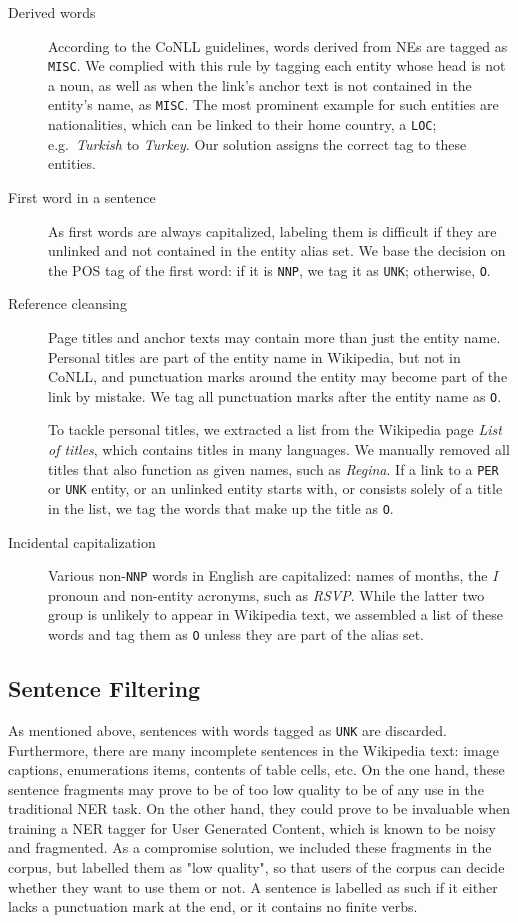 \documentclass[11pt]{article}
\begin{document}
\begin{description}
\item[Derived words] According to the CoNLL guidelines, words derived from NEs are tagged as \texttt{MISC}. We complied with this rule by tagging each entity whose head is not a noun, as well as when the link's anchor text is not contained in the entity's name, as \texttt{MISC}. The most prominent example for such entities are nationalities, which can be linked to their home country, a \texttt{LOC}; e.g.~\textit{Turkish} to \textit{Turkey}. Our solution assigns the correct tag to these entities.
\item[First word in a sentence] As first words are always capitalized, labeling them is difficult if they are unlinked and not contained in the entity alias set. We base the decision on the POS tag of the first word: if it is \texttt{NNP}, we tag it as \texttt{UNK}; otherwise, \texttt{O}.
\item[Reference cleansing] Page titles and anchor texts may contain more than just the entity name. Personal titles are part of the entity name in Wikipedia, but not in CoNLL, and punctuation marks around the entity may become part of the link by mistake. We tag all punctuation marks after the entity name as \texttt{O}.

To tackle personal titles, we extracted a list from the Wikipedia page \textit{List of titles}, which contains titles in many languages. We manually removed all titles that also function as given names, such as \textit{Regina}. If a link to a \texttt{PER} or \texttt{UNK} entity, or an unlinked entity starts with, or consists solely of a title in the list, we tag the words that make up the title as \texttt{O}.
\item[Incidental capitalization] Various non-\texttt{NNP} words in English are capitalized: names of months, the \textit{I} pronoun and non-entity acronyms, such as \textit{RSVP}. While the latter two group is unlikely to appear in Wikipedia text, we assembled a list of these words and tag them as \texttt{O} unless they are part of the alias set.
\end{description}

\subsection{Sentence Filtering}

As mentioned above, sentences with words tagged as \texttt{UNK} are discarded. Furthermore, there are many incomplete sentences in the Wikipedia text: image captions, enumerations items, contents of table cells, etc. On the one hand, these sentence fragments may prove to be of too low quality to be of any use in the traditional NER task. On the other hand, they could prove to be invaluable when training a NER tagger for User Generated Content, which is known to be noisy and fragmented. As a compromise solution, we included these fragments in the corpus, but labelled them as "low quality", so that users of the corpus can decide whether they want to use them or not. A sentence is labelled as such if it either lacks a punctuation mark at the end, or it contains no finite verbs.
\end{document}
